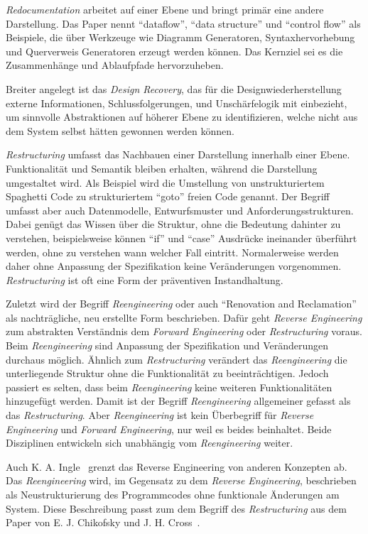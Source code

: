 \textit{Redocumentation} arbeitet auf einer Ebene und bringt primär eine andere Darstellung.
Das Paper nennt "`dataflow"', "`data structure"' und "`control flow"' als Beispiele, die über Werkzeuge wie Diagramm Generatoren, Syntaxhervorhebung und Querverweis Generatoren erzeugt werden können.
Das Kernziel sei es die Zusammenhänge und Ablaufpfade hervorzuheben.

Breiter angelegt ist das \textit{Design Recovery}, das für die Designwiederherstellung externe Informationen, Schlussfolgerungen, und Unschärfelogik mit einbezieht, um sinnvolle Abstraktionen auf höherer Ebene zu identifizieren, welche nicht aus dem System selbst hätten gewonnen werden können.

\textit{Restructuring} umfasst das Nachbauen einer Darstellung innerhalb einer Ebene.
Funktionalität und Semantik bleiben erhalten, während die Darstellung umgestaltet wird.
Als Beispiel wird die Umstellung von unstrukturiertem Spaghetti Code zu strukturiertem "`goto"' freien Code genannt.
Der Begriff umfasst aber auch Datenmodelle, Entwurfsmuster und Anforderungsstrukturen.
Dabei genügt das Wissen über die Struktur, ohne die Bedeutung dahinter zu verstehen, beispielsweise können "`if"' und "`case"' Ausdrücke ineinander überführt werden, ohne zu verstehen wann welcher Fall eintritt.
Normalerweise werden daher ohne Anpassung der Spezifikation keine Veränderungen vorgenommen.
\textit{Restructuring} ist oft eine Form der präventiven Instandhaltung.

Zuletzt wird der Begriff \textit{Reengineering} oder auch "`Renovation and Reclamation"' als nachträgliche, neu erstellte Form beschrieben.
Dafür geht \textit{Reverse Engineering} zum abstrakten Verständnis dem \textit{Forward Engineering} oder \textit{Restructuring} voraus.
Beim \textit{Reengineering} sind Anpassung der Spezifikation und Veränderungen durchaus möglich.
Ähnlich zum \textit{Restructuring} verändert das \textit{Reengineering} die unterliegende Struktur ohne die Funktionalität zu beeinträchtigen.
Jedoch passiert es selten, dass beim \textit{Reengineering} keine weiteren Funktionalitäten hinzugefügt werden.
Damit ist der Begriff \textit{Reengineering} allgemeiner gefasst als das \textit{Restructuring}.
Aber \textit{Reengineering} ist kein Überbegriff für \textit{Reverse Engineering} und \textit{Forward Engineering}, nur weil es beides beinhaltet.
Beide Disziplinen entwickeln sich unabhängig vom \textit{Reengineering} weiter.

Auch K. A. Ingle~\cite{Solr-153077417} grenzt das Reverse Engineering von anderen Konzepten ab.
Das \textit{Reengineering} wird, im Gegensatz zu dem \textit{Reverse Engineering}, beschrieben als Neustrukturierung des Programmcodes ohne funktionale Änderungen am System.
Diese Beschreibung passt zum dem Begriff des \textit{Restructuring} aus dem Paper von E. J. Chikofsky und J. H. Cross~\cite{43044}.

